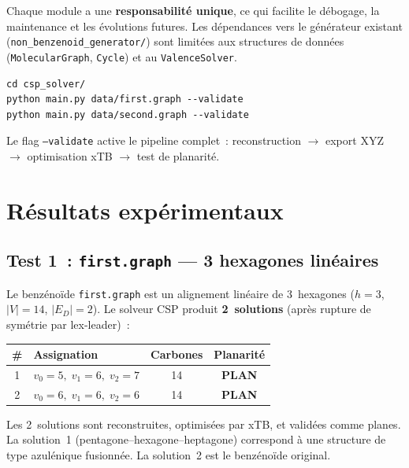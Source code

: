 \documentclass[12pt,a4paper]{article}
\theoremstyle{definition}
\theoremstyle{remark}
\newcommand{\ED}{E_{\!D}}
\begin{document}
Chaque module a une \textbf{responsabilit\'e unique}, ce qui facilite
le d\'ebogage, la maintenance et les \'evolutions futures. Les
d\'ependances vers le g\'en\'erateur existant
(\texttt{non\_benzenoid\_generator/}) sont limit\'ees aux structures de
donn\'ees (\texttt{MolecularGraph}, \texttt{Cycle}) et au
\texttt{ValenceSolver}.

\begin{notebox}[Invocation]
\begin{lstlisting}[style=benzai]
cd csp_solver/
python main.py data/first.graph --validate
python main.py data/second.graph --validate
\end{lstlisting}
Le flag \texttt{--validate} active le pipeline complet~: reconstruction
$\to$ export XYZ $\to$ optimisation xTB $\to$ test de planarit\'e.
\end{notebox}


\section{R\'esultats exp\'erimentaux}

\subsection{Test 1~: \texttt{first.graph} --- 3 hexagones lin\'eaires}

Le benz\'eno\"ide \texttt{first.graph} est un alignement lin\'eaire de
3~hexagones ($h = 3$, $|V| = 14$, $|\ED| = 2$). Le solveur CSP produit
\textbf{2~solutions} (apr\`es rupture de sym\'etrie par lex-leader)~:

\begin{center}
\begin{tabular}{clcc}
\toprule
\textbf{\#} & \textbf{Assignation} & \textbf{Carbones} & \textbf{Planarit\'e} \\
\midrule
1 & $v_0 = 5,\; v_1 = 6,\; v_2 = 7$ & 14 & \textcolor{vertOk}{\textbf{PLAN}} \\
2 & $v_0 = 6,\; v_1 = 6,\; v_2 = 6$ & 14 & \textcolor{vertOk}{\textbf{PLAN}} \\
\bottomrule
\end{tabular}
\end{center}

\begin{resultatbox}
Les 2~solutions sont reconstruites, optimis\'ees par xTB, et
valid\'ees comme planes. La solution~1 (pentagone--hexagone--heptagone)
correspond \`a une structure de type azul\'enique fusionn\'ee.
La solution~2 est le benz\'eno\"ide original.
\end{resultatbox}
\end{document}
